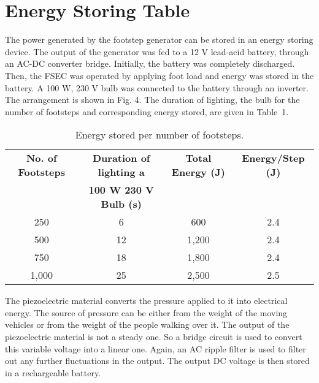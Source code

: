 \documentclass[12pt]{article}
\begin{document}
\newpage

\section*{Energy Storing Table}

The power generated by the footstep generator can be stored in an energy storing device. The output of the generator was fed to a 12 V lead-acid battery, through an AC-DC converter bridge. Initially, the battery was completely discharged. Then, the FSEC was operated by applying foot load and energy was stored in the battery. A 100 W, 230 V bulb was connected to the battery through an inverter. The arrangement is shown in Fig. 4. The duration of lighting, the bulb for the number of footsteps and corresponding energy stored, are given in Table~1.

\begin{table}[h!]
\centering
\begin{tabular}{cccc}
\toprule
\textbf{No. of Footsteps} & \textbf{Duration of lighting a} & \textbf{Total Energy (J)} & \textbf{Energy/Step (J)} \\
                          & \textbf{100 W 230 V Bulb (s)}   &                            &                           \\
\midrule
250                       & 6                               & 600                        & 2.4                       \\
500                       & 12                              & 1,200                      & 2.4                       \\
750                       & 18                              & 1,800                      & 2.4                       \\
1,000                     & 25                              & 2,500                      & 2.5                       \\
\bottomrule
\end{tabular}
\caption{Energy stored per number of footsteps.}
\end{table}

The piezoelectric material converts the pressure applied to it into electrical energy. The source of pressure can be either from the weight of the moving vehicles or from the weight of the people walking over it. The output of the piezoelectric material is not a steady one. So a bridge circuit is used to convert this variable voltage into a linear one. Again, an AC ripple filter is used to filter out any further fluctuations in the output. The output DC voltage is then stored in a rechargeable battery.
\end{document}
